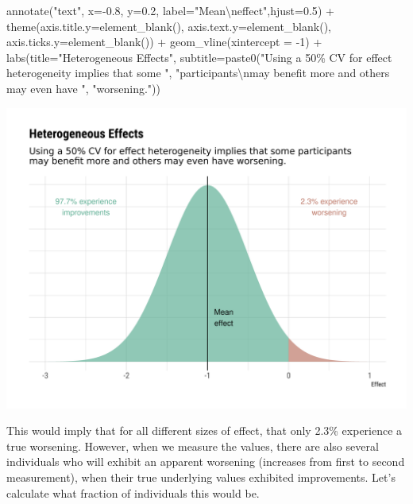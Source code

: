 \documentclass[
]{article}
\newenvironment{Shaded}{\begin{snugshade}}{\end{snugshade}}
\newcommand{\AttributeTok}[1]{\textcolor[rgb]{0.77,0.63,0.00}{#1}}
\newcommand{\DecValTok}[1]{\textcolor[rgb]{0.00,0.00,0.81}{#1}}
\newcommand{\FloatTok}[1]{\textcolor[rgb]{0.00,0.00,0.81}{#1}}
\newcommand{\FunctionTok}[1]{\textcolor[rgb]{0.00,0.00,0.00}{#1}}
\newcommand{\NormalTok}[1]{#1}
\newcommand{\SpecialCharTok}[1]{\textcolor[rgb]{0.00,0.00,0.00}{#1}}
\newcommand{\StringTok}[1]{\textcolor[rgb]{0.31,0.60,0.02}{#1}}
\begin{document}
\begin{Shaded}
\begin{Highlighting}[]
  \FunctionTok{annotate}\NormalTok{(}\StringTok{"text"}\NormalTok{, }\AttributeTok{x=}\SpecialCharTok{{-}}\FloatTok{0.8}\NormalTok{, }\AttributeTok{y=}\FloatTok{0.2}\NormalTok{, }
           \AttributeTok{label=}\StringTok{"Mean}\SpecialCharTok{\textbackslash{}n}\StringTok{effect"}\NormalTok{,}\AttributeTok{hjust=}\FloatTok{0.5}\NormalTok{) }\SpecialCharTok{+}
  \FunctionTok{theme}\NormalTok{(}\AttributeTok{axis.title.y=}\FunctionTok{element\_blank}\NormalTok{(),}
        \AttributeTok{axis.text.y=}\FunctionTok{element\_blank}\NormalTok{(),}
        \AttributeTok{axis.ticks.y=}\FunctionTok{element\_blank}\NormalTok{()) }\SpecialCharTok{+}
  \FunctionTok{geom\_vline}\NormalTok{(}\AttributeTok{xintercept =} \SpecialCharTok{{-}}\DecValTok{1}\NormalTok{) }\SpecialCharTok{+}
  \FunctionTok{labs}\NormalTok{(}\AttributeTok{title=}\StringTok{"Heterogeneous Effects"}\NormalTok{,}
       \AttributeTok{subtitle=}\FunctionTok{paste0}\NormalTok{(}\StringTok{"Using a 50\% CV for effect heterogeneity implies that some "}\NormalTok{,}
                       \StringTok{"participants}\SpecialCharTok{\textbackslash{}n}\StringTok{may benefit more and others may even have "}\NormalTok{,}
                       \StringTok{"worsening."}\NormalTok{))}
\end{Highlighting}
\end{Shaded}

\includegraphics{figures/unnamed-chunk-53-1.png}

This would imply that for all different sizes of effect, that only 2.3\%
experience a true worsening. However, when we measure the values, there
are also several individuals who will exhibit an apparent worsening
(increases from first to second measurement), when their true underlying
values exhibited improvements. Let's calculate what fraction of
individuals this would be.
\end{document}
